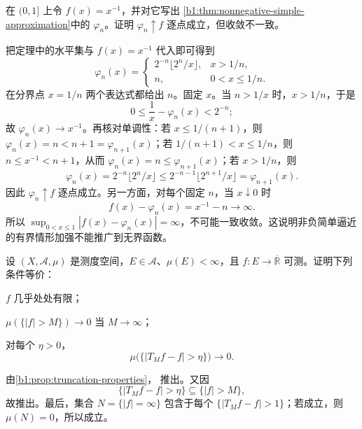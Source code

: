 \begin{exercise}\label{b1:ex:0405}
在 \((0,1]\) 上令 \(f(x)=x^{-1}\)，并对它写出%
\cref{b1:thm:nonnegative-simple-approximation}中的 \(\varphi_n\)。证明 \(\varphi_n\uparrow f\) 逐点成立，但收敛不一致。
\end{exercise}
\begin{solution}
把定理中的水平集与 \(f(x)=x^{-1}\) 代入即可得到
\[
\varphi_n(x)=
\begin{cases}
2^{-n}\lfloor2^n/x\rfloor,&x>1/n,\\
n,&0<x\leq1/n.
\end{cases}
\]
在分界点 \(x=1/n\) 两个表达式都给出 \(n\)。固定 \(x\)。当 \(n>1/x\) 时，\(x>1/n\)，于是
\[
0\leq \frac1x-\varphi_n(x)<2^{-n};
\]
故 \(\varphi_n(x)\to x^{-1}\)。再核对单调性：若 \(x\leq1/(n+1)\)，则
\(\varphi_n(x)=n<n+1=\varphi_{n+1}(x)\)；若
\(1/(n+1)<x\leq1/n\)，则 \(n\leq x^{-1}<n+1\)，从而
\(\varphi_n(x)=n\leq\varphi_{n+1}(x)\)；若 \(x>1/n\)，则
\[
\varphi_n(x)=2^{-n}\lfloor2^n/x\rfloor
\leq2^{-n-1}\lfloor2^{n+1}/x\rfloor
=\varphi_{n+1}(x).
\]
因此 \(\varphi_n\uparrow f\) 逐点成立。另一方面，对每个固定 \(n\)，当 \(x\downarrow0\) 时
\[
f(x)-\varphi_n(x)=x^{-1}-n\longrightarrow\infty.
\]
所以 \(\sup_{0<x\leq1}|f(x)-\varphi_n(x)|=\infty\)，不可能一致收敛。这说明非负简单逼近的有界情形加强不能推广到无界函数。
\end{solution}

\begin{exercise}\label{b1:ex:0406}
设 \((X,\mathcal A,\mu)\) 是测度空间，\(E\in\mathcal A\)、\(\mu(E)<\infty\)，且 \(f:E\rightarrow\overline{\mathbb R}\) 可测。证明下列条件等价：
\begin{equivalences}
  \item \label{b1:item:0406-1}\(f\) 几乎处处有限；
  \item \label{b1:item:0406-2}\(\mu(\{|f|>M\})\to0\) 当 \(M\to\infty\)；
  \item \label{b1:item:0406-3}对每个 \(\eta>0\)，
  \[
  \mu\bigl(\{|T_Mf-f|>\eta\}\bigr)\longrightarrow0.
  \]
\end{equivalences}
\end{exercise}
\begin{solution}
由\cref{b1:prop:truncation-properties}，%
推出。又因
\[
\{|T_Mf-f|>\eta\}
\subseteq\{|f|>M\},
\]
故推出。最后，集合
\(N=\{|f|=\infty\}\) 包含于每个
\(\{|T_Mf-f|>1\}\)；若成立，则
\(\mu(N)=0\)，所以成立。
\end{solution}

